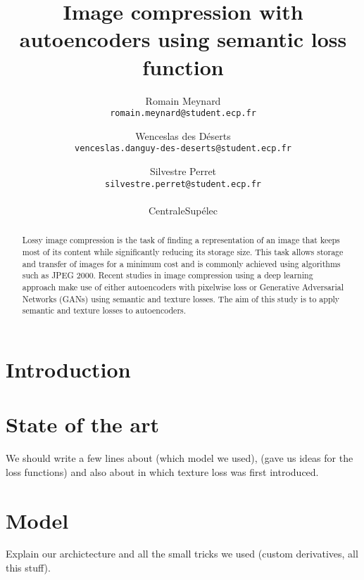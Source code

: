 \documentclass[10pt,twocolumn,letterpaper]{article}
\begin{document}
\title{Image compression with autoencoders using semantic loss function}

\author{Romain Meynard\\
{\tt\small romain.meynard@student.ecp.fr}
\and
Wenceslas des Déserts \\
{\tt\small venceslas.danguy-des-deserts@student.ecp.fr}
\and
Silvestre Perret \\
{\tt\small silvestre.perret@student.ecp.fr}	 \\
\\
CentraleSupélec\\
}

\maketitle

\begin{abstract}
Lossy image compression is the task of finding a representation of an image that keeps most of its content while significantly reducing its storage size. This task allows storage and transfer of images for a minimum cost and is commonly achieved using algorithms such as JPEG 2000. Recent studies in image compression using a deep learning approach make use of either autoencoders with pixelwise loss or Generative Adversarial Networks (GANs) using semantic and texture losses. The aim of this study is to apply semantic and texture losses to autoencoders. 
\end{abstract}

\section{Introduction}

\section{State of the art}
We should write a few lines about \cite{theis_lossy_2017} (which model we used), \cite{sajjadi_enhancenet:_2016} (gave us ideas for the loss functions) and also about \cite{gatys_texture_2015} in which texture loss was first introduced.

\section{Model}

Explain our archictecture and all the small tricks we used (custom derivatives, all this stuff). 
\end{document}
